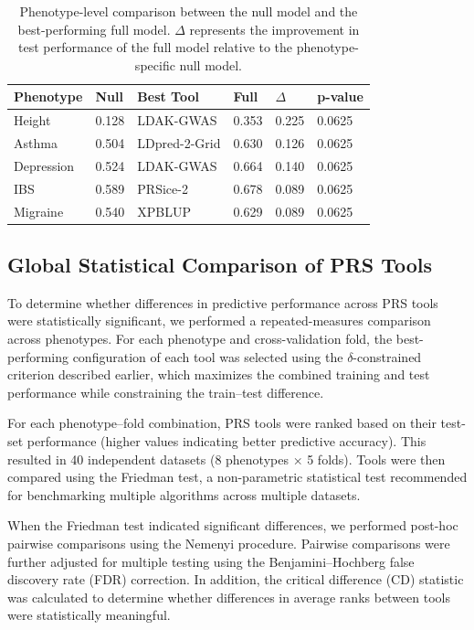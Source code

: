 \documentclass[pdflatex,sn-basic]{sn-jnl}
\begin{document}
\begin{table}[!ht]
\centering
\begin{tabular}{|l|l|l|l|l|l|}
\hline
\textbf{Phenotype} & \textbf{Null} & \textbf{Best Tool} & \textbf{Full} & \textbf{$\Delta$} & \textbf{p-value} \\
\hline
Height & 0.128 & LDAK-GWAS & 0.353 & 0.225 & 0.0625 \\
\hline
Asthma & 0.504 & LDpred-2-Grid & 0.630 & 0.126 & 0.0625 \\
\hline
Depression & 0.524 & LDAK-GWAS & 0.664 & 0.140 & 0.0625 \\
\hline
IBS & 0.589 & PRSice-2 & 0.678 & 0.089 & 0.0625 \\
\hline
Migraine & 0.540 & XPBLUP & 0.629 & 0.089 & 0.0625 \\
\hline
\end{tabular}
\caption{Phenotype-level comparison between the null model and the best-performing full model. $\Delta$ represents the improvement in test performance of the full model relative to the phenotype-specific null model.}
\label{TablePRSvsNullSummary}
\end{table}

\subsection{Global Statistical Comparison of PRS Tools}
To determine whether differences in predictive performance across PRS tools were statistically significant, we performed a repeated-measures comparison across phenotypes. For each phenotype and cross-validation fold, the best-performing configuration of each tool was selected using the $\delta$-constrained criterion described earlier, which maximizes the combined training and test performance while constraining the train–test difference.

For each phenotype–fold combination, PRS tools were ranked based on their test-set performance (higher values indicating better predictive accuracy). This resulted in 40 independent datasets (8 phenotypes × 5 folds). Tools were then compared using the Friedman test, a non-parametric statistical test recommended for benchmarking multiple algorithms across multiple datasets.

When the Friedman test indicated significant differences, we performed post-hoc pairwise comparisons using the Nemenyi procedure. Pairwise comparisons were further adjusted for multiple testing using the Benjamini–Hochberg false discovery rate (FDR) correction. In addition, the critical difference (CD) statistic was calculated to determine whether differences in average ranks between tools were statistically meaningful.
\end{document}
